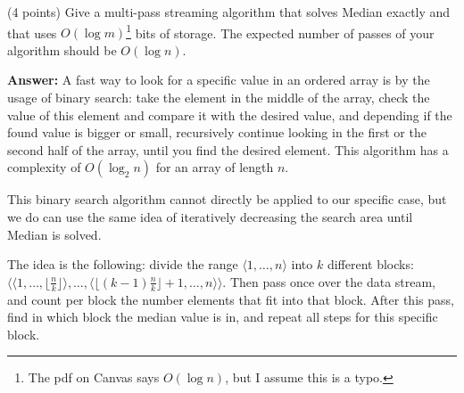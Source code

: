 \documentclass{article}
\newcommand{\median}{{\sc Median}\xspace}
\newcounter{rcounter}
\newenvironment{rlist}%
{\begin{list}{\setnr-\arabic{rcounter}}{\usecounter{rcounter}}}{\end{list}}
\begin{document}
\begin{rlist}
        \item (4 points)
        Give a multi-pass streaming algorithm that solves \median exactly and that uses $O(\log m)$\footnote{The pdf on Canvas says $O(\log n)$, but I assume this is a typo.} bits of storage. The expected number of passes of your algorithm should be $O(\log n)$.
        
        \textbf{Answer:}
        A fast way to look for a specific value in an ordered array is by the usage of binary search: take the element in the middle of the array, check the value of this element and compare it with the desired value, and depending if the found value is bigger or small, recursively continue looking in the first or the second half of the array, until you find the desired element. This algorithm has a complexity of $O(\log_2 n)$ for an array of length $n$.
        
        This binary search algorithm cannot directly be applied to our specific case, but we do can use the same idea of iteratively decreasing the search area until \median is solved.
        
        The idea is the following: divide the range $\langle 1, \ldots, n\rangle$ into $k$ different blocks: $\langle \langle 1, \ldots, \lfloor \frac{n}{k}\rfloor \rangle, \ldots, \langle \lfloor (k-1) \frac{n}{k} \rfloor + 1, \ldots, n \rangle \rangle$. Then pass once over the data stream, and count per block the number elements that fit into that block. After this pass, find in which block the median value is in, and repeat all steps for this specific block.
        

\end{rlist}
\end{document}
